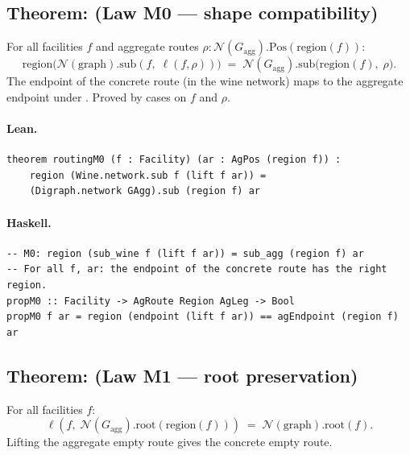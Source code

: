\documentclass[11pt,a4paper]{article}
\begin{document}
\subsection{Theorem:  (Law M0 --- shape compatibility)}

\begin{thm}
For all facilities $f$ and aggregate routes $\rho :
\mathcal{N}(G_{\mathrm{agg}}).\mathrm{Pos}(\mathrm{region}(f))$:
\[
  \mathrm{region}\bigl(\mathcal{N}(\mathrm{graph}).\mathrm{sub}(f,\; \ell(f, \rho))\bigr)
  \;=\;
  \mathcal{N}(G_{\mathrm{agg}}).\mathrm{sub}\bigl(\mathrm{region}(f),\; \rho\bigr).
\]
The endpoint of the concrete route (in the wine network) maps to the
aggregate endpoint under .  Proved by cases on $f$ and $\rho$.
\end{thm}

\paragraph{Lean.}
\begin{lstlisting}[style=lean]
theorem routingM0 (f : Facility) (ar : AgPos (region f)) :
    region (Wine.network.sub f (lift f ar)) =
    (Digraph.network GAgg).sub (region f) ar
\end{lstlisting}

\paragraph{Haskell.}
\begin{lstlisting}[style=haskell]
-- M0: region (sub_wine f (lift f ar)) = sub_agg (region f) ar
-- For all f, ar: the endpoint of the concrete route has the right region.
propM0 :: Facility -> AgRoute Region AgLeg -> Bool
propM0 f ar = region (endpoint (lift f ar)) == agEndpoint (region f) ar
\end{lstlisting}


\subsection{Theorem:  (Law M1 --- root preservation)}

\begin{thm}
For all facilities $f$:
\[
  \ell\!\left(f,\; \mathcal{N}(G_{\mathrm{agg}}).\mathrm{root}(\mathrm{region}(f))\right)
  \;=\;
  \mathcal{N}(\mathrm{graph}).\mathrm{root}(f).
\]
Lifting the aggregate empty route gives the concrete empty route.
\end{thm}
\end{document}
